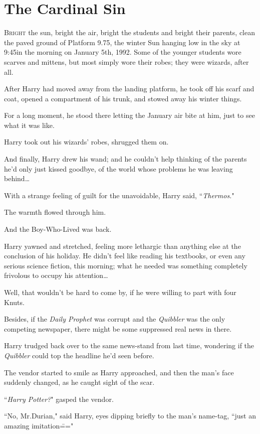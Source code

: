 \chapter{The Cardinal Sin}

\lettrine{B}{right} the sun, bright the air, bright the students and bright their parents, clean the paved ground of Platform 9.75, the winter Sun hanging low in the sky at 9:45\am in the morning on January 5th, 1992. Some of the younger students wore scarves and mittens, but most simply wore their robes; they were wizards, after all.

After Harry had moved away from the landing platform, he took off his scarf and coat, opened a compartment of his trunk, and stowed away his winter things.

For a long moment, he stood there letting the January air bite at him, just to see what it was like.

Harry took out his wizards' robes, shrugged them on.

And finally, Harry drew his wand; and he couldn't help thinking of the parents he'd only just kissed goodbye, of the world whose problems he was leaving behind{\ldots}

With a strange feeling of guilt for the unavoidable, Harry said, ``\emph{Thermos.}"

The warmth flowed through him.

And the Boy-Who-Lived was back.

Harry yawned and stretched, feeling more lethargic than anything else at the conclusion of his holiday. He didn't feel like reading his textbooks, or even any serious science fiction, this morning; what he needed was something completely frivolous to occupy his attention{\ldots}

Well, that wouldn't be hard to come by, if he were willing to part with four Knuts.

Besides, if the \emph{Daily Prophet} was corrupt and the \emph{Quibbler} was the only competing newspaper, there might be some suppressed real news in there.

Harry trudged back over to the same news-stand from last time, wondering if the \emph{Quibbler} could top the headline he'd seen before.

The vendor started to smile as Harry approached, and then the man's face suddenly changed, as he caught sight of the scar.

``\emph{Harry Potter?}" gasped the vendor.

``No, Mr.\?Durian," said Harry, eyes dipping briefly to the man's name-tag, ``just an amazing imitation\==="

